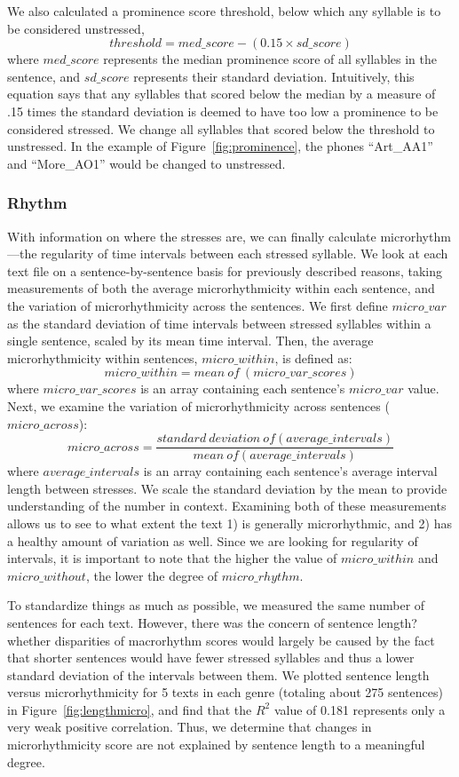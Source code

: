 \documentclass[pageno]{jpaper}
\newcommand{\quotes}[1]{``#1''}
\begin{document}
We also calculated a prominence score threshold, below which any syllable is to be considered unstressed,
\[
threshold = med\_score - (0.15 \times sd\_score)
\]
where $med\_score$ represents the median prominence score of all syllables in the sentence, and $sd\_score$ represents their standard deviation. Intuitively, this equation says that any syllables that scored below the median by a measure of .15 times the standard deviation is deemed to have too low a prominence to be considered stressed. We change all syllables that scored below the threshold to unstressed. In the example of Figure~\ref{fig:prominence}, the phones \quotes{Art\_AA1} and \quotes{More\_AO1} would be changed to unstressed. 

\subsubsection{Rhythm}
With information on where the stresses are, we can finally calculate microrhythm---the regularity of time intervals between each stressed syllable. We look at each text file on a sentence-by-sentence basis for previously described reasons, taking measurements of both the average microrhythmicity within each sentence, and the variation of microrhythmicity across the sentences. We first define $micro\_var$ as the standard deviation of time intervals between stressed syllables within a single sentence, scaled by its mean time interval. Then, the average microrhythmicity within sentences, $micro\_within$, is defined as:
\[
micro\_within = mean \ of \ (micro\_var\_scores)
\]
where $micro\_var\_scores$ is an array containing each sentence's $micro\_var$ value. Next, we examine the variation of microrhythmicity across sentences ($micro\_across$):
\[
micro\_across = \frac{standard \ deviation \ of (average\_intervals)}{mean \ of (average\_intervals)}
\]
where $average\_intervals$ is an array containing each sentence's average interval length between stresses. We scale the standard deviation by the mean to provide understanding of the number in context. Examining both of these measurements allows us to see to what extent the text 1) is generally microrhythmic, and 2) has a healthy amount of variation as well. Since we are looking for regularity of intervals, it is important to note that the higher the value of $micro\_within$ and $micro\_without$, the lower the degree of $micro\_rhythm$.

To standardize things as much as possible, we measured the same number of sentences for each text. However, there was the concern of sentence length?whether disparities of macrorhythm scores would largely be caused by the fact that shorter sentences would have fewer stressed syllables and thus a lower standard deviation of the intervals between them. We plotted sentence length versus microrhythmicity for 5 texts in each genre (totaling about 275 sentences) in Figure~\ref{fig:lengthmicro}, and find that the $R^{2}$ value of 0.181 represents only a very weak positive correlation. Thus, we determine that changes in microrhythmicity score are not explained by sentence length to a meaningful degree.
\end{document}
